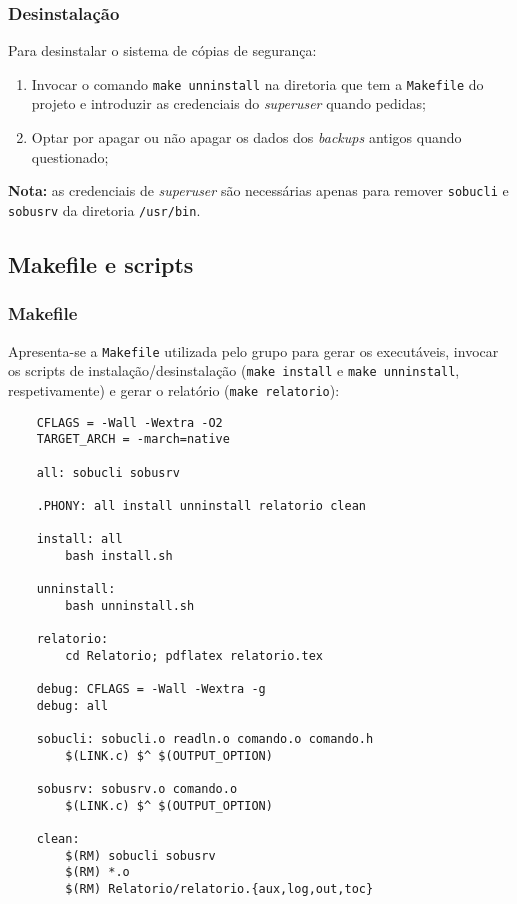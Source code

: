 \documentclass[a4paper,12pt,titlepage,portuguese]{article}
\begin{document}
\subsubsection{Desinstalação}

Para desinstalar o sistema de cópias de segurança:
	\begin{enumerate}
		\item Invocar o comando \texttt{make unninstall} na diretoria que tem a \texttt{Makefile} do projeto e introduzir as credenciais do \emph{superuser} quando pedidas;
		\item Optar por apagar ou não apagar os dados dos \emph{backups} antigos quando questionado;
	\end{enumerate}
\textbf{Nota:} as credenciais de \emph{superuser} são necessárias apenas para remover \texttt{sobucli} e \texttt{sobusrv} da diretoria \texttt{/usr/bin}.

\newpage

\subsection{Makefile e scripts}

\subsubsection{Makefile}
Apresenta-se a \texttt{Makefile} utilizada pelo grupo para gerar os executáveis, invocar os scripts de instalação/desinstalação (\texttt{make install} e \texttt{make unninstall}, respetivamente) e gerar o relatório (\texttt{make relatorio}):
	\begin{verbatim}
	CFLAGS = -Wall -Wextra -O2
	TARGET_ARCH = -march=native

	all: sobucli sobusrv

	.PHONY: all install unninstall relatorio clean

	install: all
		bash install.sh

	unninstall:
		bash unninstall.sh

	relatorio:
		cd Relatorio; pdflatex relatorio.tex

	debug: CFLAGS = -Wall -Wextra -g
	debug: all

	sobucli: sobucli.o readln.o comando.o comando.h
		$(LINK.c) $^ $(OUTPUT_OPTION)

	sobusrv: sobusrv.o comando.o
		$(LINK.c) $^ $(OUTPUT_OPTION)

	clean:
		$(RM) sobucli sobusrv
		$(RM) *.o
		$(RM) Relatorio/relatorio.{aux,log,out,toc}
	\end{verbatim}
\end{document}
